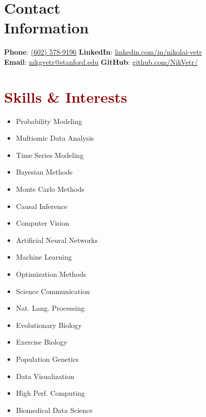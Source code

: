 \documentclass[11pt,margin,line]{resume}
\begin{document}
\name{\huge \textcolor{DarkRed}{Nikolai G. Vetr, PhD \hfill}}
\begin{resume}
\vspace{-5mm}
\section{\mysidestyle Contact\\Information}
    \textbf{Phone}: \href{tel:+16025789196}{\color{blue}(602) 578-9196}       \hfill \textbf{LinkedIn}: \href{https://www.linkedin.com/in/nikolai-vetr}{\color{blue}linkedin.com/in/nikolai-vetr} \\
\noindent \textbf{Email}: \href{mailto:nikgvetr@stanford.edu}{\color{blue}nikgvetr@stanford.edu}  \hfill \textbf{GitHub}: \href{https://www.github.com/NikVetr/}{\color{blue}github.com/NikVetr/} \vspace{0mm}\\\vspace{-2.5mm}


\section{\large\textcolor{DarkRed}{Skills \& Interests}}

\vspace{-0.0mm}
\begin{multicols}{3}
    \begin{itemize}
    \setlength\itemsep{-0.2em}
         \item Probability Modeling
         \item Multiomic Data Analysis
	 \item Time Series Modeling
	 \item Bayesian Methods
         \item Monte Carlo Methods
         \item Causal Inference
         \item Computer Vision
         \item Artificial Neural Networks
         \item Machine Learning
         \item Optimization Methods
         \item Science Communication
         \item Nat. Lang. Processing
         \item Evolutionary Biology
         \item Exercise Biology
         \item Population Genetics
         \item Data Visualization
         \item High Perf. Computing
         \item Biomedical Data Science
         

\end{itemize}
\end{multicols}
\end{resume}
\end{document}
